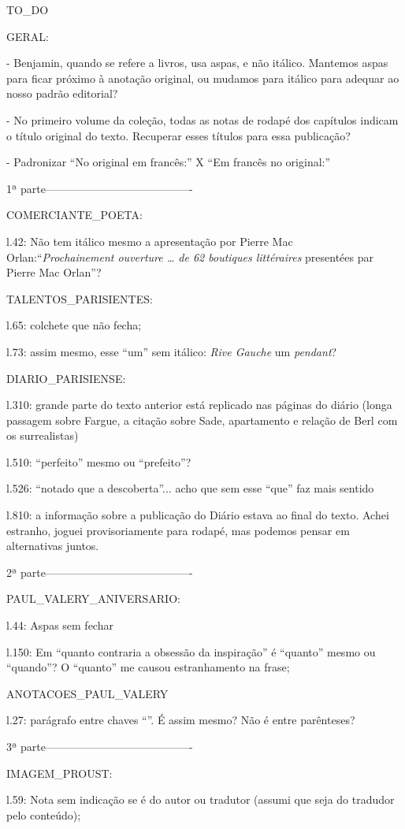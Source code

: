 TO_DO

GERAL:

- Benjamin, quando se refere a livros, usa aspas, e não itálico. Mantemos aspas para ficar próximo à anotação original, ou mudamos para itálico para adequar ao nosso padrão editorial?

- No primeiro volume da coleção, todas as notas de rodapé dos capítulos indicam o título original do texto. Recuperar esses títulos para essa publicação?

- Padronizar ``No original em francês:'' X ``Em francês no original:''

1ª parte----------------------------------------

COMERCIANTE_POETA:

l.42: Não tem itálico mesmo a apresentação por Pierre Mac Orlan:``\emph{Prochainement ouverture \ldots{} de 62 boutiques littéraires} presentées par Pierre Mac Orlan''?

TALENTOS_PARISIENTES:

l.65: colchete que não fecha;

l.73: assim mesmo, esse ``um'' sem itálico: \emph{Rive Gauche} um \emph{pendant}?

DIARIO_PARISIENSE:

l.310: grande parte do texto anterior está replicado nas páginas do diário (longa passagem sobre Fargue, a citação sobre Sade, apartamento e relação de Berl com os surrealistas)

l.510: ``perfeito'' mesmo ou ``prefeito''?

l.526: ``notado que a descoberta''... acho que sem esse ``que'' faz mais sentido

l.810: a informação sobre a publicação do Diário estava ao final do texto. Achei estranho, joguei provisoriamente para rodapé, mas podemos pensar em alternativas juntos.


2ª parte----------------------------------------

PAUL_VALERY_ANIVERSARIO:

l.44: Aspas sem fechar

l.150: Em ``quanto contraria a obsessão da inspiração'' é ``quanto'' mesmo ou ``quando''? O ``quanto'' me causou estranhamento na frase;

ANOTACOES_PAUL_VALERY

l.27: parágrafo entre chaves ``{}''. É assim mesmo? Não é entre parênteses?

3ª parte----------------------------------------

IMAGEM_PROUST:

l.59: Nota sem indicação se é do autor ou tradutor (assumi que seja do tradudor pelo conteúdo);